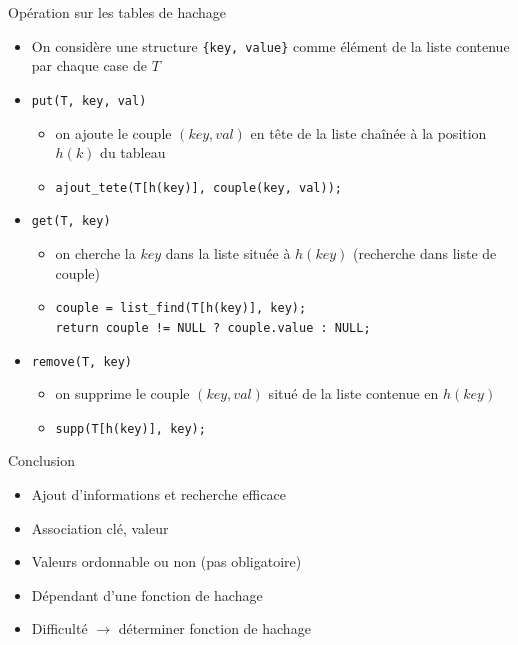 \documentclass{beamer}
\begin{document}
  \begin{frame}{Opération sur les tables de hachage}
    \begin{itemize}
      \item{On considère une structure \texttt{\{key, value\}} comme élément de la liste contenue par chaque case de $T$}
      \item{\texttt{put(T, key, val)}}
      \begin{itemize}
        \item{on ajoute le couple $(key, val)$ en tête de la liste chaînée à la position $h(k)$ du tableau}
        \item{\texttt{ajout\_tete(T[h(key)], couple(key, val));}}
      \end{itemize}
      \item{\texttt{get(T, key)}}
      \begin{itemize}
        \item{on cherche la $key$ dans la liste située à $h(key)$ (recherche dans liste de couple)}
        \item{\texttt{couple = list\_find(T[h(key)], key); \\
                      return couple != NULL ? couple.value : NULL;}}
      \end{itemize}
      \item{\texttt{remove(T, key)}}
      \begin{itemize}
        \item{on supprime le couple $(key, val)$ situé de la liste contenue en $h(key)$}
        \item{\texttt{supp(T[h(key)], key);}}
      \end{itemize}
    \end{itemize}
  \end{frame}

  \begin{frame}{Conclusion}
    \begin{itemize}
      \item{Ajout d'informations et recherche efficace}
      \item{Association clé, valeur}
      \item{Valeurs ordonnable ou non (pas obligatoire)}
      \item{Dépendant d'une fonction de hachage}
      \item{Difficulté $\rightarrow$ déterminer fonction de hachage}
    \end{itemize}
  \end{frame}
\end{document}
